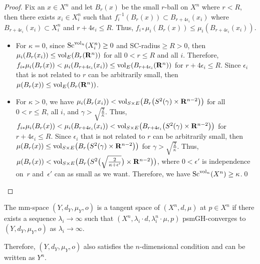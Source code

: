 \documentclass[10pt,a4paper]{amsart}
\begin{document}
\begin{proof}
Fix an $x\in X^n$ and let $B_r(x)$ be the small $r$-ball on $X^n$ where $r < R$, then there exists $x_i\in X^n_i$ such that $f^{-1}_i(B_r(x))\subset B_{r+4\epsilon_i}(x_i) $ where $B_{r+4\epsilon_i}(x_i) \subset X^n_i$ and $r+4\epsilon_i\leq R$. Thus, $f_{i*}\mu_i(B_r(x))\leq \mu_i(B_{r+4\epsilon_i}(x_i))$.
\begin{itemize}\itemsep=0pt
\item For $\kappa=0$, since ${\rm Sc}^{{\rm vol}_n}(X^n_i)\geq 0$ and SC-radius$\geq R>0$, then $\mu_i(B_r(x_i))\leq {\rm vol}_E(B_r(\mathbf{R}^n))$ for all $0<r \leq R$ and all $i$. Therefore, $f_{i*}\mu_i(B_r(x))< \mu_i(B_{r+4\epsilon_i}(x_i))\leq {\rm vol}_E(B_{r+4\epsilon_i}(\mathbf{R}^n))$ for $r+4\epsilon_i\leq R$. Since $\epsilon_i$ that is not related to $r$ can be arbitrarily small, then $\mu(B_r(x))\leq {\rm vol}_E(B_r(\mathbf{R}^n))$.
\item For $\kappa>0$, we have $\mu_i(B_r(x_i))< {\rm vol}_{S \times E} \big(B_r \big(S^2(\gamma)\times \mathbf{R}^{n-2} \big) \big)$ for all $0< r \leq R$, all $i$, and $\gamma>\sqrt{\frac{2}{\kappa}}$. Thus, $f_{i*}\mu_i(B_r(x))< \mu_i(B_{r+4\epsilon_i}(x_i))< {\rm vol}_{S\times E} \big(B_{r+4\epsilon_i} \big(S^2(\gamma)\times \mathbf{R}^{n-2} \big) \big)$ for $r+4\epsilon_i\leq R$. Since $\epsilon_i$ that is not related to $r$ can be arbitrarily small, then $\mu(B_r(x))\leq {\rm vol}_{S\times E} \big(B_{r} \big(S^2(\gamma)\times \mathbf{R}^{n-2} \big) \big)$ for $\gamma>\sqrt{\frac{2}{\kappa}}$. Thus, $\mu(B_r(x))< {\rm vol}_{S\times E} \big(B_{r} \big(S^2\big(\sqrt{\frac{2}{\kappa+\epsilon'}}\big)\times \mathbf{R}^{n-2} \big) \big)$, where $0<\epsilon'$ is independence on~$r$ and~$\epsilon'$ can as small as we want. Therefore, we have ${\rm Sc}^{{\rm vol}_n}(X^n)\geq \kappa$.\hfill\qed
\end{itemize}\renewcommand{\qed}{}
\end{proof}

\begin{Definition}
The mm-space $(Y,d_Y,\mu_Y, o)$ is a tangent space of $(X^n,d,\mu)$ at $p\in X^n$ if there exists a sequence $\lambda_i\to \infty$ such that $(X^n,\lambda_i\cdot d,\lambda_i^n \cdot\mu,p)$ psmGH-converges to $(Y,d_Y,\mu_Y, o)$ as $\lambda_i\to \infty$.
\end{Definition}

Therefore, $(Y,d_Y,\mu_Y, o)$ also satisfies the $n$-dimensional condition and can be written as $Y^n$.
\end{document}
